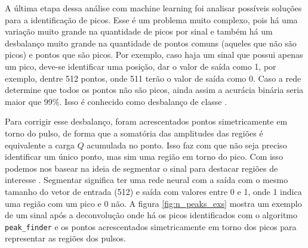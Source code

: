 \documentclass[a4paper,12pt,oneside]{book}
\begin{document}
\par A última etapa dessa análise com machine learning foi analisar possíveis soluções para a identificação de picos. Esse é um problema muito complexo, pois há uma variação muito grande na quantidade de picos por sinal e também há um desbalanço muito grande na quantidade de pontos comuns (aqueles que não são picos) e pontos que são picos. Por exemplo, caso haja um sinal que possui apenas um pico, deve-se identificar uma posição, dar o valor de saída como 1, por exemplo, dentre 512 pontos, onde 511 terão o valor de saída como 0. Caso a rede determine que todos os pontos não são picos, ainda assim a acurácia binária seria maior que 99\%. Isso é conhecido como desbalanço de classe \cite{inproceedings}.

\par Para corrigir esse desbalanço, foram acrescentados pontos simetricamente em torno do pulso, de forma que a somatória das amplitudes das regiões é equivalente a carga $Q$ acumulada no ponto. Isso faz com que não seja preciso identificar um único ponto, mas sim uma região em torno do pico. Com isso podemos nos basear na ideia de segmentar o sinal para destacar regiões de interesse \cite{aly2011research}. Segmentar significa ter uma rede neural com a saída com o mesmo tamanho do vetor de entrada (512) e saída com valores entre 0 e 1, onde 1 indica uma região com um pico e 0 não. A figura \ref{fig:n_peaks_exs} mostra um exemplo de um sinal após a deconvolução onde há os picos identificados com o algoritmo \texttt{peak\_finder} e os pontos acrescentados simetricamente em torno dos picos para representar as regiões dos pulsos.

\end{document}
